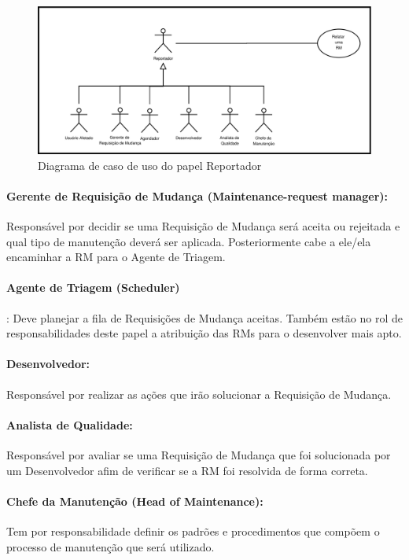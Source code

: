 \begin{figure}[htpb]
	\centering
	\includegraphics[width=0.8\linewidth]{./chapter-manutencao-software-visao-geral/img/diagrama-caso-uso-reportador.pdf}
	\caption{Diagrama de caso de uso do papel Reportador}
\label{fig:diagrama-caso-uso-reportador}
\end{figure}

\paragraph{Gerente de Requisição de Mudança (Maintenance-request manager):}
Res\-pon\-sá\-vel por decidir se uma Requisição de Mudança será aceita ou
rejeitada e qual tipo de manutenção deverá ser aplicada. Posteriormente cabe a
ele/ela encaminhar a RM para o Agente de Triagem.

\paragraph{Agente de Triagem (Scheduler)}:
Deve planejar a fila de Requisições de Mudança aceitas. Também estão no rol de
responsabilidades deste papel a atribuição das RMs para o desenvolver mais
apto.

\paragraph{Desenvolvedor:}
Responsável por realizar as ações que irão solucionar a Requisição de Mudança.

\paragraph{Analista de Qualidade:}
Responsável por avaliar se uma Requisição de Mudança que foi solucionada por um
Desenvolvedor afim de verificar se a RM foi resolvida de forma correta.

\paragraph{Chefe da Manutenção (Head of	Maintenance):}
Tem por responsabilidade definir os padrões e procedimentos que compõem o
processo de manutenção que será utilizado.

